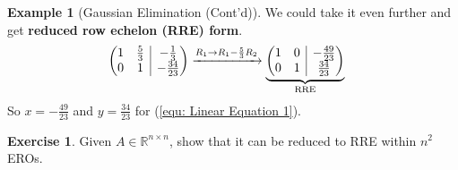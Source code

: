 \documentclass[12pt, a4paper]{article}
\makeatletter
\newenvironment{amatrix}[1]{%
  \left(\begin{array}{@{}*{#1}{c}|c@{}}
}{%
  \end{array}\right)
}
\newcommand{\R}{\mathbb{R}}
\theoremstyle{remark}
\theoremstyle{definition}
\newtheorem{example}{Example}
\newtheorem{exercise}{Exercise}
\numberwithin{equation}{section}
\numberwithin{definition}{section}
\numberwithin{example}{section}
\numberwithin{exercise}{section}
\numberwithin{remark}{section}
\numberwithin{figure}{section}
\makeatother
\begin{document}
\begin{example}[Gaussian Elimination (Cont'd)]
    We could take it even further and get \textbf{reduced row echelon (RRE) form}.
    \begin{align*}
        \begin{amatrix}{2}
            1 & \frac{5}{3} & -\frac{1}{3} \\
            0 & 1 & -\frac{34}{23}
        \end{amatrix}
        & \xrightarrow{R_1 \rightarrow R_1 - \frac{5}{3}R_2}
        \underbrace{
        \begin{amatrix}{2}
            1 & 0 & -\frac{49}{23} \\
            0 & 1 & \frac{34}{23}
    \end{amatrix}}_{\text{RRE}}
    \end{align*}
    So $x = -\frac{49}{23}$ and $y = \frac{34}{23}$ for (\ref{equ: Linear Equation 1}).
\end{example}
\begin{exercise}
    Given $A \in \R^{n \times n}$, show that it can be reduced to RRE within $n^2$ EROs.
\end{exercise}
\end{document}
